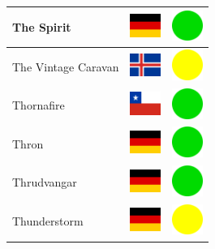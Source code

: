 \documentclass[12pt, a4paper, twoside]{report}
\begin{document}
\begin{center}
\begin{longtable}{|p{5cm}|p{2cm}|p{2cm}|}
The Spirit & \includegraphics[width=1cm]{4x3/de} & \includegraphics[width=1cm]{likes/y} \\ \hline
The Vintage Caravan & \includegraphics[width=1cm]{4x3/is} & \includegraphics[width=1cm]{likes/m} \\ \hline
Thornafire & \includegraphics[width=1cm]{4x3/cl} & \includegraphics[width=1cm]{likes/y} \\ \hline
Thron & \includegraphics[width=1cm]{4x3/de} & \includegraphics[width=1cm]{likes/y} \\ \hline
Thrudvangar & \includegraphics[width=1cm]{4x3/de} & \includegraphics[width=1cm]{likes/y} \\ \hline
Thunderstorm & \includegraphics[width=1cm]{4x3/de} & \includegraphics[width=1cm]{likes/m} \\ \hline

\end{longtable}
\end{center}
\end{document}
